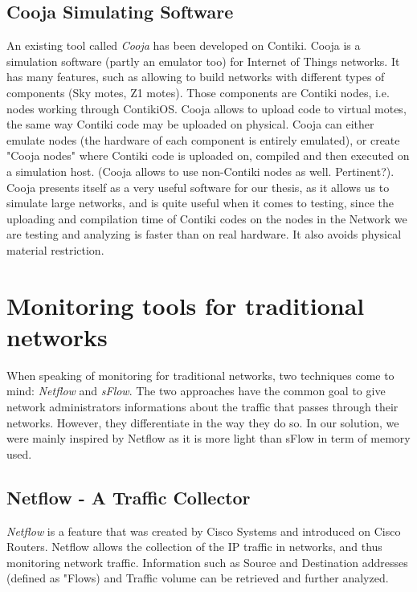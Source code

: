 \section{Cooja Simulating Software}
An existing tool called \textit{Cooja} has been developed on Contiki. Cooja is a simulation software (partly an emulator too) for Internet of Things networks. It has many features, such as allowing to build networks with different types of components (Sky motes, Z1 motes). Those components are Contiki nodes, i.e. nodes working through ContikiOS. Cooja allows to upload code to virtual motes, the same way Contiki code may be uploaded on physical. Cooja can either emulate nodes (the hardware of each component is entirely emulated), or create "Cooja nodes" where Contiki code is uploaded on, compiled and then executed on a simulation host. (Cooja allows to use non-Contiki nodes as well. Pertinent?). Cooja presents itself as a very useful software for our thesis, as it allows us to simulate large networks, and is quite useful when it comes to testing, since the uploading and compilation time of Contiki codes on the nodes in the Network we are testing and analyzing is faster than on real hardware. It also avoids physical material restriction.

\chapter{Monitoring tools for traditional networks}

When speaking of monitoring for traditional networks, two techniques come to mind: \textit{Netflow} and \textit{sFlow}. The two approaches have the common goal to give network administrators informations about the traffic that passes through their networks. However, they differentiate in the way they do so. In our solution, we were mainly inspired by Netflow as it is more light than sFlow in term of memory used.

\section{Netflow - A Traffic Collector}
\textit{Netflow} is a feature that was created by Cisco Systems and introduced on Cisco Routers. Netflow allows the collection of the IP traffic in networks, and thus monitoring network traffic. Information such as Source and Destination addresses (defined as "Flows) and Traffic volume can be retrieved and further analyzed.\\

